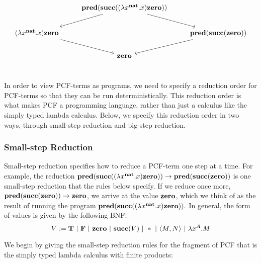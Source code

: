 \[
\begin{tikzcd}[ampersand replacement=\&]
\& \mathbf{pred} (\mathbf{succ} ((\lambda x^{\textbf{nat}}.x)\mathbf{zero})) \ar[ld] \ar[rd]\& \\
(\lambda x^{\textbf{nat}}.x)\textbf{zero} \ar[rd] \& \& \textbf{pred} ( \textbf{succ} (\mathbf{zero})) \ar[ld] \\
\& \textbf{zero} \& \\
\end{tikzcd}
\]

In order to view PCF-terms as programs, we need to specify a reduction order for PCF-terms so that they can be run deterministically. This reduction order is what makes PCF a programming language, rather than just a calculus like the simply typed lambda calculus. Below, we specify this reduction order in two ways, through small-step reduction and big-step reduction.

\subsubsection{Small-step Reduction}  %


Small-step reduction specifies how to reduce a PCF-term one step at a time. For example, the reduction $\textbf{pred}(\textbf{succ}((\lambda x^{\textbf{nat}}.x)\textbf{zero})) \to \textbf{pred}(\textbf{succ}(\textbf{zero}))$ is one small-step reduction that the rules below specify. If we reduce once more, $\textbf{pred}(\textbf{succ}(\textbf{zero})) \to \textbf{zero}$, we arrive at the value $\textbf{zero}$, which we think of as the result of running the program $\textbf{pred}(\textbf{succ}((\lambda x^{\textbf{nat}}.x)\textbf{zero})).$ In general, the form of values is given by the following BNF:
$$ V := \textbf{T} \ \mathbf{|}\  \textbf{F} \ \mathbf{|}\  \textbf{zero} \ \mathbf{|}\  \textbf{succ}(V) \ \mathbf{|}\  * \ \mathbf{|}\  \langle M,N \rangle \ \mathbf{|}\  \lambda x^A.M$$

We begin by giving the small-step reduction rules for the fragment of PCF that is the simply typed lambda calculus with finite products:

